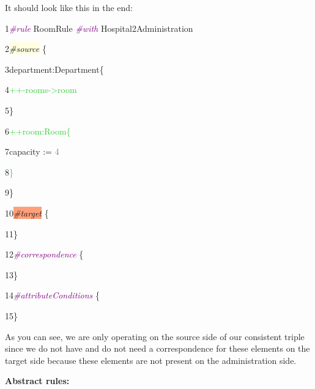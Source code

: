 It should look like this in the end:\newline

{

1\hspace{0.5cm}\textcolor{Purple}{\textit{\#rule}} RoomRule \textcolor{Purple}{\textit{\#with}} Hospital2Administration

2\hspace{0.5cm}\colorbox{LightYellow}{\textit{\#source}} \{ 

3\hspace{1cm}department:Department\{

4\hspace{2cm}\textcolor{LimeGreen}{++-rooms->room}

5\hspace{1cm}\}

6\hspace{1cm}\textcolor{LimeGreen}{++room:Room\{}

7\hspace{2cm}capacity := \textcolor{Grey}{4}

8\hspace{1cm}\textcolor{LimeGreen}{\}}

9\hspace{0.5cm}\}

10\hspace{0.5cm}\colorbox{LightSalmon}{\textit{\#target}} \{

11\hspace{0.5cm}\}

12\hspace{0.5cm}\textcolor{Purple}{\textit{\#correspondence}} \{

13\hspace{0.5cm}\}

14\hspace{0.5cm}\textcolor{Purple}{\textit{\#attributeConditions}} \{

15\hspace{0.5cm}\} \newline

}

As you can see, we are only operating on the source side of our consistent triple since we do not have and do not need a correspondence for these elements on the target side because these elements are not present on the administration side. \newline

\clearpage

\textbf{Abstract rules:}

